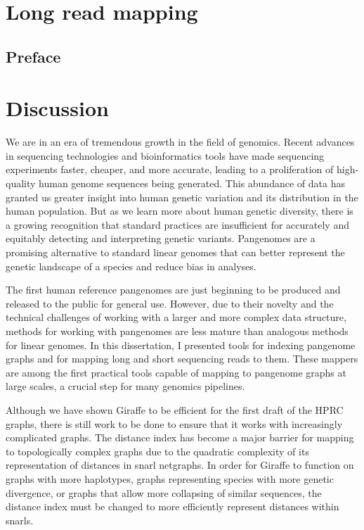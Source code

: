 \documentclass[11pt]{ucscthesis}
\begin{document}
\chapter{Long read mapping}
\label{chapter:lr-giraffe}
\section{Preface}

\chapter{Discussion}

We are in an era of tremendous growth in the field of genomics.
Recent advances in sequencing technologies and bioinformatics tools have made sequencing experiments faster, cheaper, and more accurate, leading to a proliferation of high-quality human genome sequences being generated.
This abundance of data has granted us greater insight into human genetic variation and its distribution in the human population.
But as we learn more about human genetic diversity, there is a growing recognition that standard practices are insufficient for accurately and equitably detecting and interpreting genetic variants. 
Pangenomes are a promising alternative to standard linear genomes that can better represent the genetic landscape of a species and reduce bias in analyses.

The first human reference pangenomes are just beginning to be produced and released to the public for general use.
However, due to their novelty and the technical challenges of working with a larger and more complex data structure, methods for working with pangenomes are less mature than analogous methods for linear genomes.
In this dissertation, I presented tools for indexing pangenome graphs and for mapping long and short sequencing reads to them.
These mappers are among the first practical tools capable of mapping to pangenome graphs at large scales, a crucial step for many genomics pipelines.

Although we have shown Giraffe to be efficient for the first draft of the HPRC graphs, there is still work to be done to ensure that it works with increasingly complicated graphs.
The distance index has become a major barrier for mapping to topologically complex graphs due to the quadratic complexity of its representation of distances in snarl netgraphs.
In order for Giraffe to function on graphs with more haplotypes, graphs representing species with more genetic divergence, or graphs that allow more collapsing of similar sequences, the distance index must be changed to more efficiently represent distances within snarls.
\end{document}
